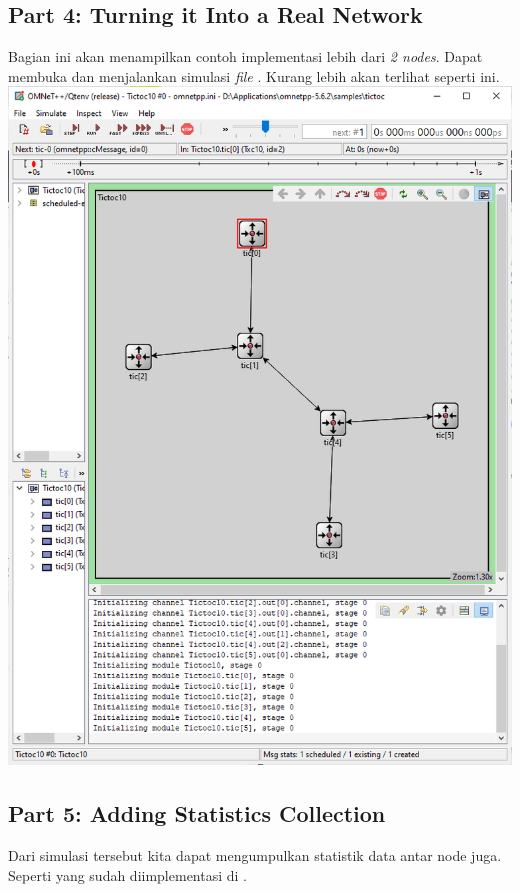 \documentclass[conference]{IEEEtran}
\begin{document}
\subsection{Part 4: Turning it Into a Real Network}
Bagian ini akan menampilkan contoh implementasi lebih dari \textit{2 nodes}. Dapat membuka dan menjalankan simulasi \textit{file}  . Kurang lebih akan terlihat seperti ini.
\includegraphics[scale=0.25]{images/tictoc10.ned.png}

\subsection{Part 5: Adding Statistics Collection}
Dari simulasi tersebut kita dapat mengumpulkan statistik data antar node juga. Seperti yang sudah diimplementasi di .
\end{document}
